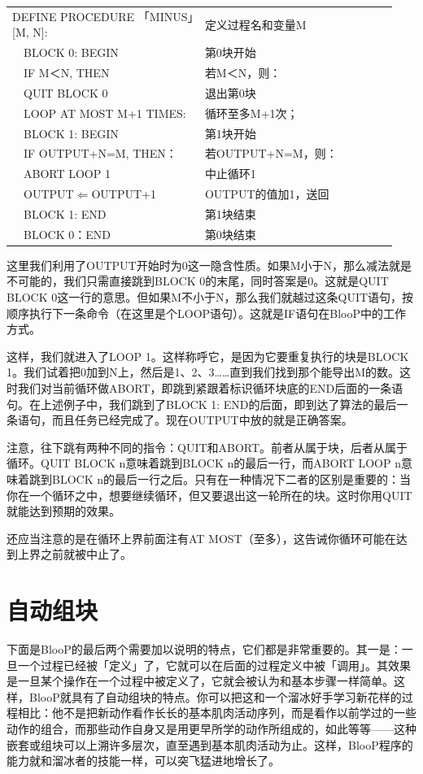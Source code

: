 \documentclass[
  12pt,
  twoside,
  openright,
  oldfontcommands,
]{memoir}
\begin{document}
\begin{longtable}[]{>{\raggedright\arraybackslash}p{0.47\linewidth} >{\raggedright\arraybackslash}p{0.47\linewidth}}
\toprule\noalign{}
\endhead
\bottomrule\noalign{}
\endlastfoot
DEFINE PROCEDURE 「MINUS」{[}M, N{]}: & 定义过程名和变量M \\
　BLOCK 0: BEGIN & 第0块开始 \\
　IF M＜N, THEN & 若M＜N，则： \\
　QUIT BLOCK 0 & 退出第0块 \\
　LOOP AT MOST M+1 TIMES: & 循环至多M+1次； \\
　BLOCK 1: BEGIN & 第1块开始 \\
　IF OUTPUT+N=M, THEN： & 若OUTPUT+N=M，则： \\
　ABORT LOOP 1 & 中止循环1 \\
　OUTPUT$\Leftarrow$OUTPUT+1 & OUTPUT的值加1，送回 \\
　BLOCK 1: END & 第1块结束 \\
　BLOCK 0：END & 第0块结束 \\
\end{longtable}

这里我们利用了OUTPUT开始时为0这一隐含性质。如果M小于N，那么减法就是不可能的，我们只需直接跳到BLOCK
0的末尾，同时答案是0。这就是QUIT BLOCK
0这一行的意思。但如果M不小于N，那么我们就越过这条QUIT语句，按顺序执行下一条命令（在这里是个LOOP语句）。这就是IF语句在BlooP中的工作方式。

这样，我们就进入了LOOP 1。这样称呼它，是因为它要重复执行的块是BLOCK
1。我们试着把0加到N上，然后是1、2、3\ldots\ldots 直到我们找到那个能导出M的数。这时我们对当前循环做ABORT，即跳到紧跟着标识循环块底的END后面的一条语句。在上述例子中，我们跳到了BLOCK
1:
END的后面，即到达了算法的最后一条语句，而且任务已经完成了。现在OUTPUT中放的就是正确答案。

注意，往下跳有两种不同的指令：QUIT和ABORT。前者从属于块，后者从属于循环。QUIT
BLOCK n意味着跳到BLOCK n的最后一行，而ABORT LOOP n意味着跳到BLOCK
n的最后一行之后。只有在一种情况下二者的区别是重要的：当你在一个循环之中，想要继续循环，但又要退出这一轮所在的块。这时你用QUIT就能达到预期的效果。

还应当注意的是在循环上界前面注有AT
MOST（至多），这告诫你循环可能在达到上界之前就被中止了。

\section{自动组块}

下面是BlooP的最后两个需要加以说明的特点，它们都是非常重要的。其一是：一旦一个过程已经被「定义」了，它就可以在后面的过程定义中被「调用」。其效果是一旦某个操作在一个过程中被定义了，它就会被认为和基本步骤一样简单。这样，BlooP就具有了自动组块的特点。你可以把这和一个溜冰好手学习新花样的过程相比：他不是把新动作看作长长的基本肌肉活动序列，而是看作以前学过的一些动作的组合，而那些动作自身又是用更早所学的动作所组成的，如此等等------这种嵌套或组块可以上溯许多层次，直至遇到基本肌肉活动为止。这样，BlooP程序的能力就和溜冰者的技能一样，可以突飞猛进地增长了。
\end{document}
